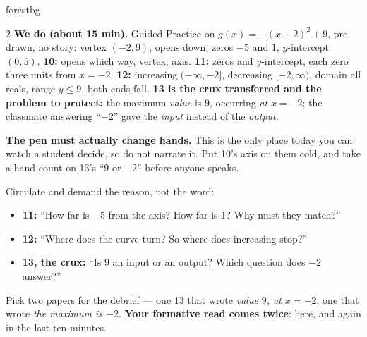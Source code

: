 \documentclass[10pt]{article}
\begin{document}
\begin{skillbox}{forestbg}
\begin{multicols}{2}
\columnbreak
\textbf{We do (about 15 min).} Guided Practice on $g(x)=-(x+2)^2+9$, pre-drawn, no story: vertex
$(-2,9)$, opens down, zeros $-5$ and $1$, $y$-intercept $(0,5)$. \textbf{10:} opens which way,
vertex, axis. \textbf{11:} zeros and $y$-intercept, each zero three units from $x=-2$.
\textbf{12:} increasing $(-\infty,-2]$, decreasing $[-2,\infty)$, domain all reals, range
$y\le9$, both ends fall. \textbf{13 is the crux transferred and the problem to protect:} the
maximum \emph{value} is $9$, occurring \emph{at} $x=-2$; the classmate answering ``$-2$'' gave the
\emph{input} instead of the \emph{output}.

\textbf{The pen must actually change hands.} This is the only place today you can watch a student
decide, so do not narrate it. Put 10's axis on them cold, and take a hand count on 13's ``$9$ or
$-2$'' before anyone speaks.

Circulate and demand the reason, not the word:
\begin{itemize}[leftmargin=1.1em, nosep]
  \item \textbf{11:} ``How far is $-5$ from the axis? How far is $1$? Why must they match?''
  \item \textbf{12:} ``Where does the curve turn? So where does increasing stop?''
  \item \textbf{13, the crux:} ``Is $9$ an input or an output? Which question does $-2$ answer?''
\end{itemize}
Pick two papers for the debrief --- one 13 that wrote \emph{value $9$, at $x=-2$}, one that wrote
\emph{the maximum is $-2$}. \textbf{Your formative read comes twice}: here, and again in the last
ten minutes.
\end{multicols}
\end{skillbox}
\end{document}
